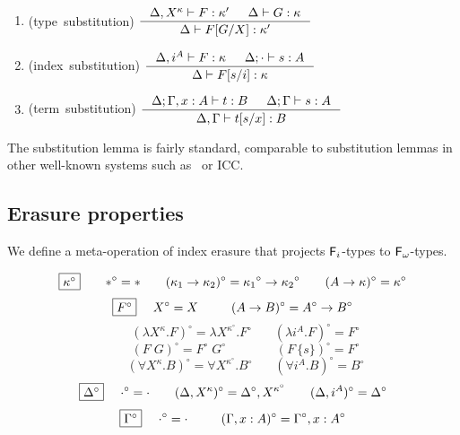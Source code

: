 \begin{lemma}[substitution]\mbox{}\\[-3mm]
\label{lem:subst}
\begin{enumerate}
\item
\label{lem:tysubst}
\mbox{\rm (type substitution)}
$\inference{\Delta,X^\kappa |- F:\kappa' & \Delta |- G:\kappa}
	{\Delta |- F[G/X]:\kappa'} $
\medskip

\item
\label{lem:ixsubst}
\mbox{\rm (index substitution)}
$ \inference{\Delta,i^A |- F:\kappa & \Delta;\cdot |- s:A}
	{\Delta |- F[s/i]:\kappa} $
\medskip

\item
\label{lem:tmsubst}
\mbox{\rm (term substitution)}
$ \inference{\Delta;\Gamma,x:A |- t:B & \Delta;\Gamma |- s:A}
	{\Delta,\Gamma |- t[s/x]:B} $
\end{enumerate}
\end{lemma}
The substitution lemma is fairly standard, comparable to substitution lemmas
in other well-known systems such as \Fw\ or ICC.

\subsection{Erasure properties}
\label{ssec:erasure}

We define a meta-operation of index erasure that projects $\mathsf{F}_i$-types
to $\mathsf{F}_\omega$-types.

\begin{definition}\label{def:ierase}
\[ \fbox{$\kappa^\circ$}
 ~~~~ ~~
 *^\circ =
 *
 ~~~~ ~~
 (\kappa_1 -> \kappa_2)^\circ =
 {\kappa_1}^\circ -> {\kappa_2}^\circ
 ~~~~ ~~
 (A -> \kappa)^\circ =
 \kappa^\circ
\]
\[ \fbox{$F^\circ$}
 ~~~~
 X^\circ =
 X
 ~~~~ ~~~~
 (A -> B)^\circ =
 A^\circ -> B^\circ
\]
\[ \qquad
 (\lambda X^\kappa.F)^\circ =
 \lambda X^{\kappa^\circ}.F^\circ
 ~~~~ ~~~~
 (\lambda i^A.F)^\circ =
 F^\circ
\]
\[ \qquad
 (F\;G)^\circ =
 F^\circ\;G^\circ
 ~~~~ ~~~~ ~~~~ ~~~~ ~~
 (F\,\{s\})^\circ =
 F^\circ
\]
\[ \qquad
 (\forall X^\kappa . B)^\circ =
 \forall X^{\kappa^\circ} . B^\circ
 ~~~~ ~~~~
 (\forall i^A . B)^\circ =
 B^\circ
\]
\[ \fbox{$\Delta^\circ$}
 ~~~~
 \cdot^\circ = \cdot
 ~~~~ ~~
 (\Delta,X^\kappa)^\circ = \Delta^\circ,X^{\kappa^\circ}
 ~~~~ ~~
 (\Delta,i^A)^\circ = \Delta^\circ
\]
\[ \fbox{$\Gamma^\circ$}
 ~~~~
 \cdot^\circ = \cdot
 ~~~~ ~~~~
 (\Gamma,x:A)^\circ = \Gamma^\circ,x:A^\circ
\]
\end{definition}


